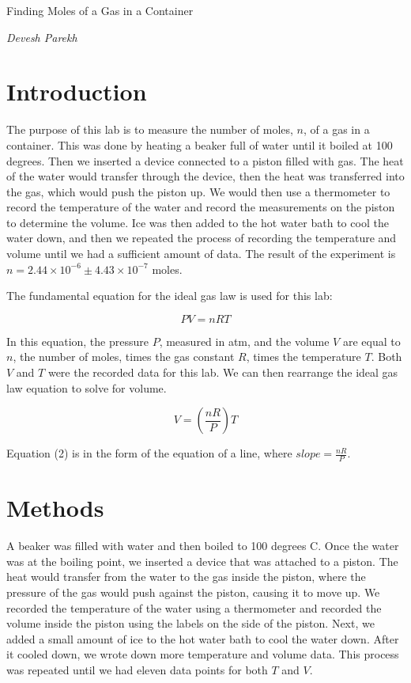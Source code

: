 \documentclass[onecolumn]{article}
\begin{document}
\begin{center}

{\Huge Finding Moles of a Gas in a Container}\vskip 20pt

{\huge \em Devesh Parekh}

\end{center}

\section*{Introduction}

The purpose of this lab is to measure the number of moles, $n$, of a gas in a container. This was done by heating a beaker full of water until it boiled at 100 degrees. Then we inserted a device connected to a piston filled with gas. The heat of the water would transfer through the device, then the heat was transferred into the gas, which would push the piston up. We would then use a thermometer to record the temperature of the water and record the measurements on the piston to determine the volume. Ice was then added to the hot water bath to cool the water down, and then we repeated the process of recording the temperature and volume until we had a sufficient amount of data. The result of the experiment is $n=2.44\times10^{-6}\pm4.43\times10^{-7}$ moles.

The fundamental equation for the ideal gas law is used for this lab:

\begin{equation}
PV=nRT
\end{equation}

In this equation, the pressure $P$, measured in atm, and the volume $V$ are equal to $n$, the number of moles, times the gas constant $R$, times the temperature $T$. Both $V$ and $T$ were the recorded data for this lab. We can then rearrange the ideal gas law equation to solve for volume.

\begin{equation}
V=\left(\frac{nR}{P}\right)T
\end{equation}

Equation (2) is in the form of the equation of a line, where $slope=\frac{nR}{P}$.

\section*{Methods}

A beaker was filled with water and then boiled to 100 degrees C. Once the water was at the boiling point, we inserted a device that was attached to a piston. The heat would transfer from the water to the gas inside the piston, where the pressure of the gas would push against the piston, causing it to move up. We recorded the temperature of the water using a thermometer and recorded the volume inside the piston using the labels on the side of the piston. Next, we added a small amount of ice to the hot water bath to cool the water down. After it cooled down, we wrote down more temperature and volume data. This process was repeated until we had eleven data points for both $T$ and $V$.
\end{document}
